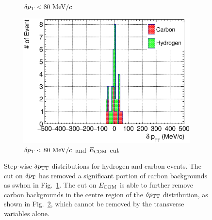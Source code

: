 \begin{figure}
\begin{subfigure}[b]{\trfigwid\textwidth}
          \caption{$\delta p_\textrm{T} < 80~\textrm{MeV}/c$}
          \label{subfig:hsel-dang-dpt80}
     \end{subfigure}
     \begin{subfigure}[b]{\trfigwid\textwidth}
          \centering
          \includegraphics[width=\textwidth]{figures/perf/tki/SFGpTPCmu_dptt_stack_al15_GetH_dpt80_wdang.eps}
          \caption{$\delta p_\textrm{T} < 80~\textrm{MeV}/c$ and $E_{\textrm{COM}}$ cut}
          \label{subfig:hsel-dang-dpt80-ecom}
     \end{subfigure}
     \caption{Step-wise $\delta p_\textrm{TT}$ distributions for hydrogen and carbon events.
     The cut on $\delta p_\textrm{T}$ has removed a significant portion of carbon backgrounds as swhon in Fig.~\ref{subfig:hsel-dang-dpt80}.
     The cut on $E_{\textrm{COM}}$ is able to further remove carbon backgrounds in the centre region of the $\delta p_\textrm{TT}$ distribution, as shown in Fig.~\ref{subfig:hsel-dang-dpt80-ecom}, which cannot be removed by the transverse variables alone.
     }
     \label{fig:hsel-dptt-step}
     \end{figure}

